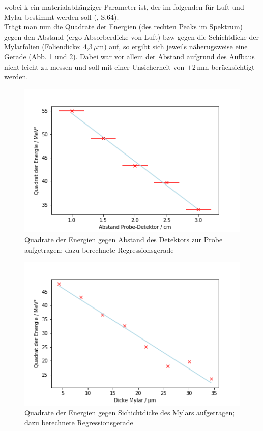 wobei k ein materialabhängiger Parameter ist, der im folgenden für Luft und Mylar bestimmt werden soll (\cite{Jaekel1997}, S.64).\\

Trägt man nun die Quadrate der Energien (des rechten Peaks im Spektrum) gegen den Abstand (ergo Absorberdicke von Luft) bzw 
gegen die Schichtdicke der Mylarfolien (Foliendicke: 4,3\,$\mu$m) auf, so ergibt sich jeweils näherugsweise eine Gerade (Abb. \ref{bild:luftger} 
und \ref{bild:mylarger}). Dabei war vor allem der Abstand aufgrund des Aufbaus nicht leicht zu messen und soll mit einer Unsicherheit 
von $\pm$2\,mm berücksichtigt werden.\\

\begin{figure}[h]
    \captionsetup{justification=centering,margin=2cm}
    \centering
    \includegraphics[scale=0.75]{Bilder/luftger.png}
    \caption{Quadrate der Energien gegen Abstand des Detektors zur Probe aufgetragen; dazu berechnete Regressionsgerade}
    \label{bild:luftger}
\end{figure}

\begin{figure}[h]
    \captionsetup{justification=centering,margin=2cm}
    \centering
    \includegraphics[scale=0.75]{Bilder/mylarger.png}
    \caption{Quadrate der Energien gegen Sichichtdicke des Mylars aufgetragen; dazu berechnete Regressionsgerade}
    \label{bild:mylarger}
\end{figure}

